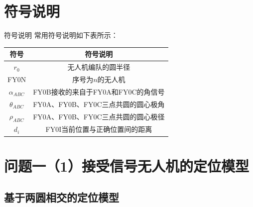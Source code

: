 \documentclass[aspectratio=169]{beamer}
\begin{document}

\section{符号说明}

\begin{frame}{符号说明}
    常用符号说明如下表所示：
    \begin{table}[!ht]
        \centering
        \begin{tabular}{cc}
            \toprule
            符号  &  符号说明\\
            \midrule
            $r_0$ & 无人机编队的圆半径\\
            FY0N  & 序号为$n$的无人机\\
            $\alpha_{ABC}$ & FY0B接收的来自于FY0A和FY0C的角信号\\
            $\theta_{ABC}$ & FY0A、FY0B、FY0C三点共圆的圆心极角\\
            $\rho_{ABC}$ & FY0A、FY0B、FY0C三点共圆的圆心极径\\
            $d_{i}$ & FY0I当前位置与正确位置间的距离\\
            \bottomrule
        \end{tabular}
    \end{table}
\end{frame}


\section[问题1-1]{问题一（1）接受信号无人机的定位模型}

\subsection{基于两圆相交的定位模型}
\end{document}
